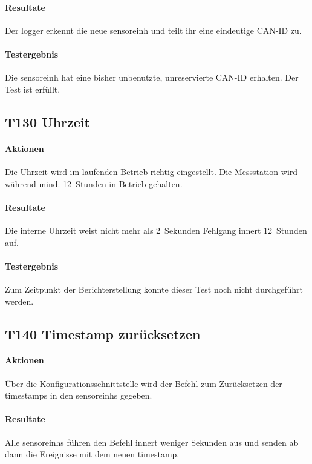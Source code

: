 \paragraph{Resultate} Der \gls{logger} erkennt die neue \gls{sensoreinh} und teilt ihr eine eindeutige CAN-ID zu.

\paragraph{Testergebnis} Die \gls{sensoreinh} hat eine bisher unbenutzte, unreservierte CAN-ID erhalten. Der Test ist erfüllt.

\subsection{T130 Uhrzeit}
\paragraph{Aktionen} Die Uhrzeit wird im laufenden Betrieb richtig eingestellt. Die Messstation wird während mind. 12~Stunden in Betrieb gehalten.

\paragraph{Resultate} Die interne Uhrzeit weist nicht mehr als 2~Sekunden Fehlgang innert 12~Stunden auf.

\paragraph{Testergebnis} Zum Zeitpunkt der Berichterstellung konnte dieser Test noch nicht durchgeführt werden. 

\subsection{T140 Timestamp zurücksetzen}
\paragraph{Aktionen} Über die Konfigurationsschnittstelle wird der Befehl zum Zurücksetzen der \gls{timestamp}s in den \glspl{sensoreinh} gegeben.

\paragraph{Resultate} Alle \glspl{sensoreinh} führen den Befehl innert weniger Sekunden aus und senden ab dann die Ereignisse mit dem neuen \gls{timestamp}.

